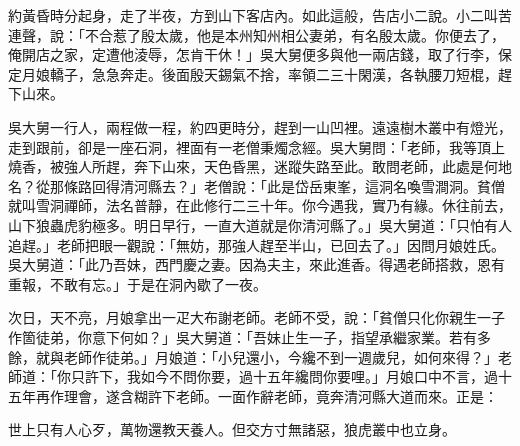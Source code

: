 約黃昏時分起身，走了半夜，方到山下客店內。{}如此這般，告店小二說。小二叫苦連聲，說：「不合惹了殷太歲，他是本州知州相公妻弟，有名殷太歲。你便去了，俺開店之家，定遭他淩辱，怎肯干休！」吳大舅便多與他一兩店錢，取了行李，保定月娘轎子，急急奔走。後面殷天錫氣不捨，率領二三十閑漢，各執腰刀短棍，趕下山來。

吳大舅一行人，兩程做一程，約四更時分，趕到一山凹裡。遠遠樹木叢中有燈光，走到跟前，卻是一座石洞，裡面有一老僧秉燭念經。吳大舅問：「老師，我等頂上燒香，被強人所趕，奔下山來，天色昏黑，迷蹤失路至此。敢問老師，此處是何地名？從那條路回得清河縣去？」老僧說：「此是岱岳東峯，這洞名喚雪澗洞。貧僧就叫雪洞禪師，法名普靜，在此修行二三十年。你今遇我，實乃有緣。休往前去，山下狼蟲虎豹極多。明日早行，一直大道就是你清河縣了。」吳大舅道：「只怕有人追趕。」老師把眼一觀說：「無妨，那強人趕至半山，已回去了。」因問月娘姓氏。吳大舅道：「此乃吾妹，西門慶之妻。因為夫主，來此進香。得遇老師搭救，恩有重報，不敢有忘。」于是在洞內歇了一夜。

次日，天不亮，月娘拿出一疋大布謝老師。老師不受，說：「貧僧只化你親生一子作箇徒弟，你意下何如？」{}吳大舅道：「吾妹止生一子，指望承繼家業。若有多餘，就與老師作徒弟。」月娘道：「小兒還小，今纔不到一週歲兒，如何來得？」老師道：「你只許下，我如今不問你要，過十五年纔問你要哩。」月娘口中不言，過十五年再作理會，遂含糊許下老師。一面作辭老師，竟奔清河縣大道而來。正是：

\begin{myquote}
世上只有人心歹，萬物還教天養人。但交方寸無諸惡，狼虎叢中也立身。
\end{myquote}

